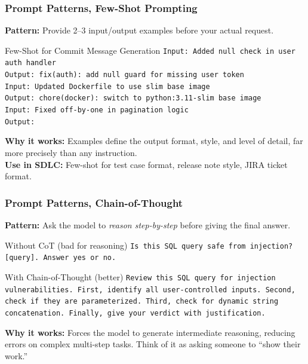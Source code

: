 \begin{frame}[fragile]\frametitle{Prompt Patterns, Few-Shot Prompting}
\textbf{Pattern:} Provide 2--3 input/output examples before your actual request.

\begin{block}{Few-Shot for Commit Message Generation}
\texttt{Input: Added null check in user auth handler}\\
\texttt{Output: fix(auth): add null guard for missing user token}\\[0.4em]
\texttt{Input: Updated Dockerfile to use slim base image}\\
\texttt{Output: chore(docker): switch to python:3.11-slim base image}\\[0.4em]
\texttt{Input: Fixed off-by-one in pagination logic}\\
\texttt{Output:}
\end{block}

\textbf{Why it works:} Examples define the output format, style, and level of detail, far more precisely than any instruction.\\
\textbf{Use in SDLC:} Few-shot for test case format, release note style, JIRA ticket format.
\end{frame}

\begin{frame}[fragile]\frametitle{Prompt Patterns, Chain-of-Thought}
\textbf{Pattern:} Ask the model to \textit{reason step-by-step} before giving the final answer.

\begin{block}{Without CoT (bad for reasoning)}
\texttt{Is this SQL query safe from injection? [query]. Answer yes or no.}
\end{block}

\begin{block}{With Chain-of-Thought (better)}
\texttt{Review this SQL query for injection vulnerabilities. First, identify all user-controlled inputs. Second, check if they are parameterized. Third, check for dynamic string concatenation. Finally, give your verdict with justification.}
\end{block}

\textbf{Why it works:} Forces the model to generate intermediate reasoning, reducing errors on complex multi-step tasks. Think of it as asking someone to ``show their work.''
\end{frame}

